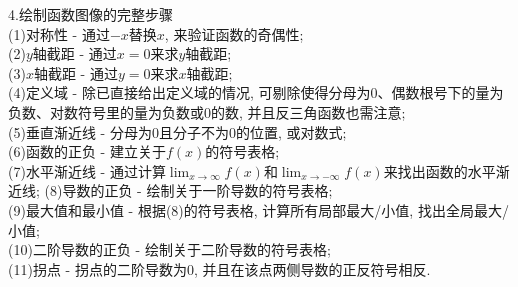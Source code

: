 4.绘制函数图像的完整步骤\\
(1)对称性 - 通过$-x$替换$x$, 来验证函数的奇偶性;\\
(2)$y$轴截距 - 通过$x=0$来求$y$轴截距;\\
(3)$x$轴截距 - 通过$y=0$来求$x$轴截距;\\
(4)定义域 - 除已直接给出定义域的情况, 可剔除使得分母为0、偶数根号下的量为负数、对数符号里的量为负数或0的数, 并且反三角函数也需注意;\\
(5)垂直渐近线 - 分母为0且分子不为0的位置, 或对数式;\\
(6)函数的正负 - 建立关于$f(x)$的符号表格;\\
(7)水平渐近线 - 通过计算$\lim_{x\to\infty}f(x)$和$\lim_{x\to -\infty}f(x)$来找出函数的水平渐近线;
(8)导数的正负 - 绘制关于一阶导数的符号表格;\\
(9)最大值和最小值 - 根据(8)的符号表格, 计算所有局部最大/小值, 找出全局最大/小值;\\
(10)二阶导数的正负 - 绘制关于二阶导数的符号表格;\\
(11)拐点 - 拐点的二阶导数为0, 并且在该点两侧导数的正反符号相反.\\[2ex]
